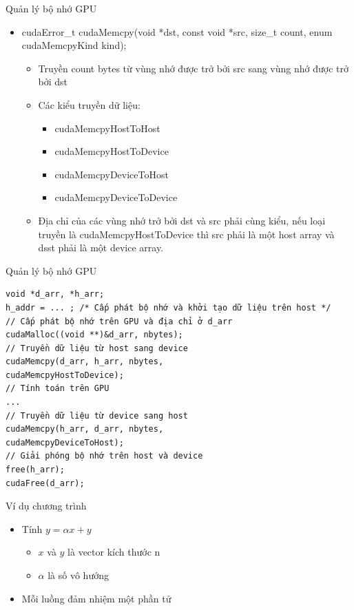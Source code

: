 \documentclass[10pt]{beamer}
\theoremstyle{remark}
\numberwithin{algocf}{section}
\numberwithin{equation}{section}
\numberwithin{dl}{section}
\numberwithin{figure}{section}
\begin{document}
\begin{frame}{Quản lý bộ nhớ GPU}
    \begin{itemize}
        \item cudaError\_t cudaMemcpy(void *dst, const void *src, size\_t count,
                                      enum cudaMemcpyKind kind);

        \begin{itemize}
            \item Truyền count bytes từ vùng nhớ được trở bởi src sang vùng nhớ được trở bởi dst
            \item Các kiểu truyền dữ liệu:
            \begin{itemize}
                \item cudaMemcpyHostToHost
                \item cudaMemcpyHostToDevice
                \item cudaMemcpyDeviceToHost
                \item cudaMemcpyDeviceToDevice
            \end{itemize}
            \item Địa chỉ của các vùng nhớ trở bởi dst và src phải cùng kiểu, nếu loại truyền là cudaMemcpyHostToDevice thì src phải là một host array và dsst phải là một device array.
        \end{itemize}
    \end{itemize}
    
\end{frame}

\begin{frame}{Quản lý bộ nhớ GPU}
    \begin{verbatim}
void *d_arr, *h_arr;
h_addr = ... ; /* Cấp phát bộ nhớ và khởi tạo dữ liệu trên host */
// Cấp phát bộ nhớ trên GPU và địa chỉ ở d_arr
cudaMalloc((void **)&d_arr, nbytes);
// Truyền dữ liệu từ host sang device
cudaMemcpy(d_arr, h_arr, nbytes,
cudaMemcpyHostToDevice);
// Tính toán trên GPU
...
// Truyền dữ liệu từ device sang host
cudaMemcpy(h_arr, d_arr, nbytes,
cudaMemcpyDeviceToHost);
// Giải phóng bộ nhớ trên host và device
free(h_arr);
cudaFree(d_arr);
    \end{verbatim}
\end{frame}

\begin{frame}{Ví dụ chương trình}
    \begin{itemize}
        \item Tính $y=\alpha x + y$
        \begin{itemize}
            \item $x$ và $y$ là vector kích thước n
            \item $\alpha$ là số vô hướng
        \end{itemize}
        \item Mỗi luồng đảm nhiệm một phần tử
    \end{itemize}
\end{frame}
\end{document}

